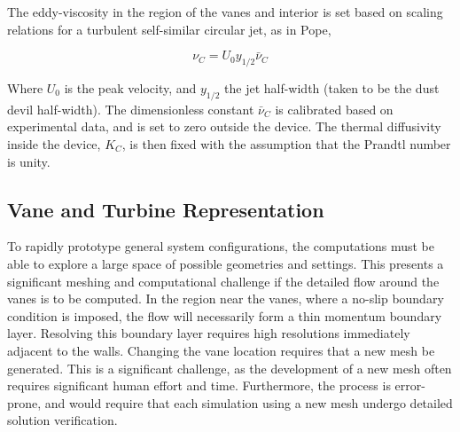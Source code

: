 The eddy-viscosity in the region of the vanes and interior is set based
on scaling relations for a turbulent self-similar circular jet, as in 
Pope\cite{pope2000turbulent},
 
\begin{equation}
  \nu_C = U_0 y_{1/2} \bar \nu_C
\end{equation}

Where $U_0$ is the peak velocity, and $y_{1/2}$ the jet half-width
(taken to be the dust devil half-width).  
The dimensionless constant $\bar \nu_C $ is calibrated based on
experimental data, and is set to zero outside the device. 
The thermal diffusivity inside the device, $K_C$, is then fixed with the 
assumption that the Prandtl number is unity.  




\subsection{Vane and Turbine Representation}

To rapidly prototype general system configurations, the
computations must be able to explore a large space of possible
geometries and settings. This presents a significant meshing and 
computational challenge if the detailed flow around the vanes is to be
computed. In the region near the vanes, where a no-slip boundary
condition is imposed, the flow will necessarily form a thin momentum
boundary layer. Resolving this boundary layer requires high resolutions
immediately adjacent to the walls. Changing the vane location requires
that a new mesh be generated.
This is a significant
challenge, as the development of a new mesh often requires significant
human effort and time. Furthermore, the process is error-prone, 
and would require that each simulation using a new mesh undergo 
detailed solution verification. 


